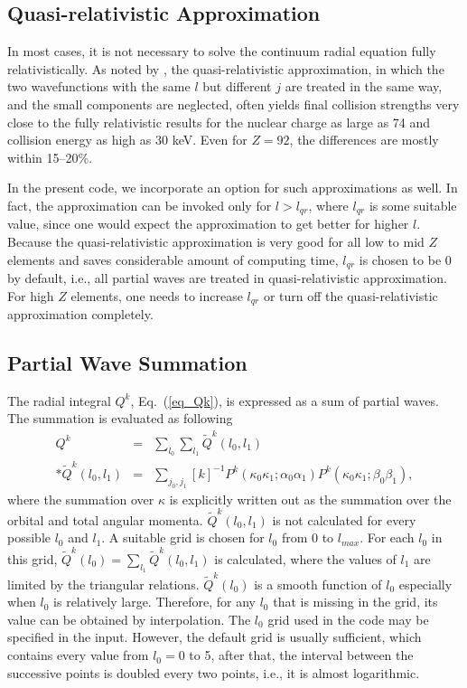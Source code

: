 \subsection{Quasi-relativistic Approximation}
In most cases, it is not necessary to solve the continuum radial equation fully
relativistically. As noted by \citet{zhang89}, the quasi-relativistic
approximation, in which the two wavefunctions with the same $l$ but different
$j$ are treated in the same way, and the small components are neglected, often
yields final collision strengths very close to the fully relativistic results
for the nuclear charge as large as 74 and collision energy as high as 30 keV.
Even for $Z = 92$, the differences are mostly within 15--20\%. 

In the present code, we incorporate an option for such approximations as
well. In fact, the 
approximation can be invoked only for $l > l_{qr}$, where $l_{qr}$ is some
suitable value, since one would expect the approximation to get better for
higher $l$. Because
the quasi-relativistic approximation is very good for all low to mid $Z$
elements and saves 
considerable amount of computing time, $l_{qr}$ is chosen to be 0 by default,
i.e., all 
partial waves are treated in quasi-relativistic approximation. For high $Z$
elements, one needs to increase $l_{qr}$ or turn off the quasi-relativistic
approximation completely.

\subsection{Partial Wave Summation}
The radial integral $Q^k$, Eq.~(\ref{eq_Qk}), is expressed as a sum of
partial waves. The summation is evaluated as following
\begin{eqnarray}
Q^k &=& \sum_{l_0}\sum_{l_1} \tilde{Q}^k(l_0,l_1) \nonumber\\*
\tilde{Q}^k(l_0,l_1) &=& \sum_{j_0,j_1}
[k]^{-1}P^k(\kappa_0\kappa_1;\alpha_0\alpha_1)
P^k(\kappa_0\kappa_1;\beta_0\beta_1),
\end{eqnarray}
where the summation over $\kappa$ is explicitly written out as the summation
over the orbital and total angular
momenta. $\tilde{Q}^k(l_0,l_1)$ is not calculated for every possible $l_0$
and $l_1$. A suitable grid is chosen for $l_0$ from 0 to $l_{max}$. For each 
$l_0$ in this grid, $\tilde{Q}^k(l_0) = \sum_{l_1}\tilde{Q}^k(l_0,l_1)$ is
calculated, where the values of $l_1$ are limited by the triangular
relations. $\tilde{Q}^k(l_0)$ is a smooth function of $l_0$ especially when 
$l_0$ is relatively large. Therefore, for any $l_0$ that is missing in the
grid, its value can be obtained by interpolation. The $l_0$ grid used
in the code may be specified in the input. However, the default grid is
usually sufficient, which contains every value from $l_0 = 0$ to 5, after
that, the interval between the successive points is doubled every two points,
i.e., it is almost logarithmic. 

